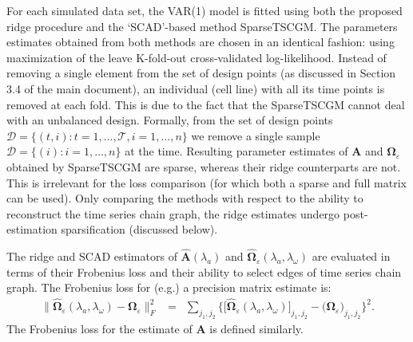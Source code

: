 \documentclass[a4paper]{article}
\begin{document}
For each simulated data set, the VAR(1) model is fitted using both the proposed ridge procedure and the `SCAD'-based method SparseTSCGM. The parameters estimates obtained from both methods are chosen in an identical fashion: using maximization of the leave K-fold-out cross-validated log-likelihood. Instead of removing a single element from the set of design points (as discussed in Section 3.4 of the main document), an individual (cell line) with all its time points is removed at each fold. This is due to the fact that the SparseTSCGM cannot deal with an unbalanced design. Formally, from the set of design points $\mathcal{D} = \{ (t,i): t=1, \ldots, \mathcal{T}, i=1, \ldots, n \}$ we remove a single sample $\mathcal{D}=\{(i): i = 1, \ldots, n\}$ at the time. Resulting parameter estimates of $\mathbf{A}$ and $\boldsymbol{\Omega}_{\varepsilon}$ obtained by SparseTSCGM are sparse, whereas their ridge counterparts are not. This is irrelevant for the loss comparison (for which both a sparse and full matrix can be used). Only comparing the methods with respect to the ability to reconstruct the time series chain graph, the ridge estimates undergo post-estimation sparsification (discussed below).

The ridge and SCAD estimators of $\mathbf{\hat{A}}(\lambda_a)$ and $\widehat{\mathbf{\Omega}}_{\varepsilon}(\lambda_a, \lambda_{\omega})$ are evaluated in terms of their Frobenius loss and their ability to select edges of time series chain graph. The Frobenius loss for (e.g.) a precision  matrix estimate is:
\begin{eqnarray*}
\big\| \widehat{\mathbf{\Omega}}_{\varepsilon}(\lambda_a, \lambda_{\omega}) - \mathbf{\Omega}_{\varepsilon} \big\|_F^2  & = & \sum_{j_1, j_2} \Big\{ \big[ \widehat{\mathbf{\Omega}}_{\varepsilon}(\lambda_a, \lambda_{\omega}) ]_{j_1, j_2} - \big( \mathbf{\Omega}_{\varepsilon}
 )_{j_1, j_2} \Big\}^2.
\end{eqnarray*}
The Frobenius loss for the estimate of $\mathbf{A}$ is defined similarly.


\end{document}
